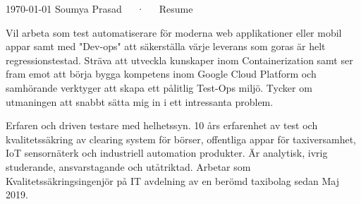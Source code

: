 \documentclass[12pt, a4paper]{awesome-cv}
\begin{document}
\makecvheader

\makecvfooter
  {\today}
  {Soumya Prasad~~~·~~~Resume}
  {\thepage}

\begin{cvparagraph}

    Vil arbeta som test automatiserare för moderna web applikationer eller mobil appar samt med "Dev-ops" att säkerställa
    värje leverans som goras är helt regressionstestad. Sträva att utveckla kunskaper inom Containerization samt ser fram
    emot att börja bygga kompetens inom Google Cloud Platform och samhörande verktyger att skapa ett pålitlig Test-Ops miljö.
    Tycker om utmaningen att snabbt sätta mig in i ett intressanta problem.
\end{cvparagraph}

\begin{cvparagraph}

    Erfaren och driven testare med helhetssyn. 10 års erfarenhet av test och kvalitetssäkring av
    clearing system för börser, offentliga appar för taxiversamhet, IoT sensornäterk och industriell automation produkter.
    Är analytisk, ivrig studerande, ansvarstagande och utåtriktad.
    Arbetar som Kvalitetssäkringsingenjör på IT avdelning av en berömd taxibolag sedan Maj 2019.
\end{cvparagraph}
\end{document}
